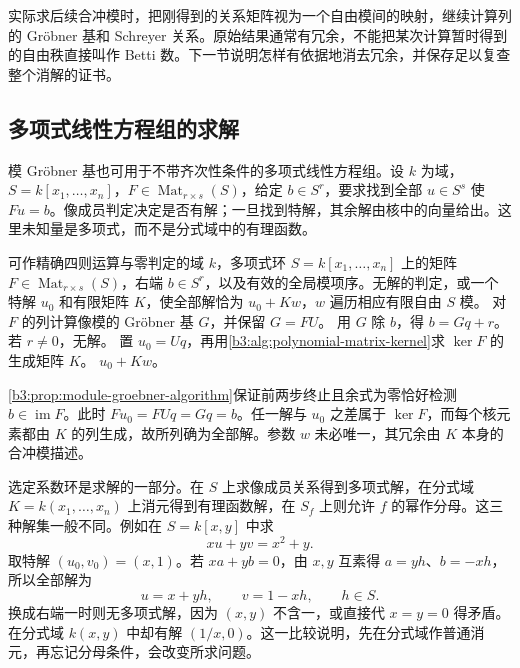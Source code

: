 \ProseParagraphBreak
实际求后续合冲模时，把刚得到的关系矩阵视为一个自由模间的映射，继续计算列的 Gröbner 基和 Schreyer 关系。原始结果通常有冗余，不能把某次计算暂时得到的自由秩直接叫作 Betti 数。下一节说明怎样有依据地消去冗余，并保存足以复查整个消解的证书。

\subsection{多项式线性方程组的求解}
\label{b3:subsec:2104:04}

模 Gröbner 基也可用于不带齐次性条件的多项式线性方程组。设 \(k\) 为域，\(S=k[x_1,\ldots,x_n]\)，\(F\in\operatorname{Mat}_{r\times s}(S)\)，给定 \(b\in S^r\)，要求找到全部 \(u\in S^s\) 使 \(Fu=b\)。像成员判定决定是否有解；一旦找到特解，其余解由核中的向量给出。这里未知量是多项式，而不是分式域中的有理函数。

\begin{algorithm}[htbp]
	\caption{多项式线性方程求解}
	\label{b3:alg:polynomial-linear-system}
	\begin{algorithmsteps}{可作精确四则运算与零判定的域 \(k\)，多项式环 \(S=k[x_1,\ldots,x_n]\) 上的矩阵 \(F\in\operatorname{Mat}_{r\times s}(S)\)，右端 \(b\in S^r\)，以及有效的全局模项序。}{无解的判定，或一个特解 \(u_0\) 和有限矩阵 \(K\)，使全部解恰为 \(u_0+Kw\)，\(w\) 遍历相应有限自由 \(S\) 模。}
		\State 对 \(F\) 的列计算像模的 Gröbner 基 \(G\)，并保留 \(G=FU\)。
		\State 用 \(G\) 除 \(b\)，得 \(b=Gq+r\)。若 \(r\ne0\)，\Return 无解。
		\State 置 \(u_0=Uq\)，再用\cref{b3:alg:polynomial-matrix-kernel}求 \(\ker F\) 的生成矩阵 \(K\)。
		\State \Return \(u_0+Kw\)。
	\end{algorithmsteps}
\end{algorithm}

\cref{b3:prop:module-groebner-algorithm}保证前两步终止且余式为零恰好检测 \(b\in\operatorname{im}F\)。此时 \(Fu_0=FUq=Gq=b\)。任一解与 \(u_0\) 之差属于 \(\ker F\)，而每个核元素都由 \(K\) 的列生成，故所列确为全部解。参数 \(w\) 未必唯一，其冗余由 \(K\) 本身的合冲模描述。

\ProseParagraphBreak
选定系数环是求解的一部分。在 \(S\) 上求像成员关系得到多项式解，在分式域 \(K=k(x_1,\ldots,x_n)\) 上消元得到有理函数解，在 \(S_f\) 上则允许 \(f\) 的幂作分母。这三种解集一般不同。例如在 \(S=k[x,y]\) 中求
\[
	xu+yv=x^2+y.
\]
取特解 \((u_0,v_0)=(x,1)\)。若 \(xa+yb=0\)，由 \(x,y\) 互素得 \(a=yh\)、\(b=-xh\)，所以全部解为
\[
	u=x+yh,\qquad v=1-xh,\qquad h\in S.
\]
换成右端一时则无多项式解，因为 \((x,y)\) 不含一，或直接代 \(x=y=0\) 得矛盾。在分式域 \(k(x,y)\) 中却有解 \((1/x,0)\)。这一比较说明，先在分式域作普通消元，再忘记分母条件，会改变所求问题。
